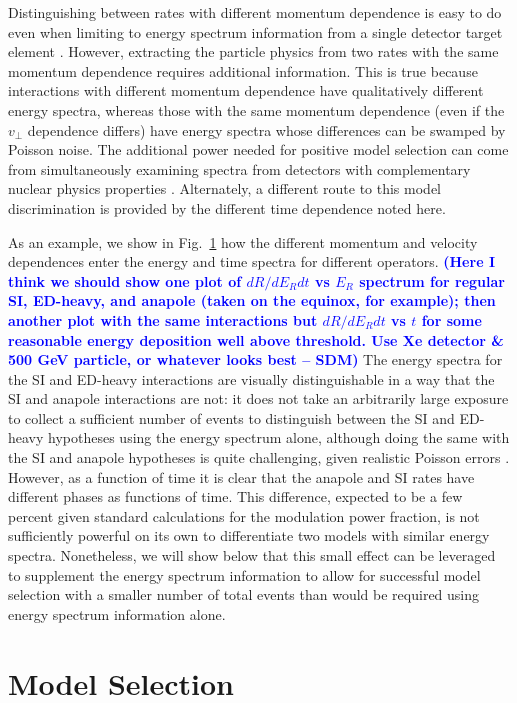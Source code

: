 \documentclass[11pt]{article}
\newcommand{\Fig}[1]{Fig.~\ref{#1}} \newcommand{\Figs}[2]{Figs.~\ref{#1} and \ref{#2}}
\newcommand{\sdm}[1]{\textcolor{blue}{\textbf{(#1 -- SDM)}}}
\begin{document}
Distinguishing between rates with different momentum dependence is easy to do even when limiting to energy spectrum information from a single detector target element \cite{Gluscevic:2015sqa}. However, extracting the particle physics from two rates with the same momentum dependence requires additional information. This is true because interactions with different momentum dependence have qualitatively different energy spectra, whereas those with the same momentum dependence (even if the $v_\perp$ dependence differs) have energy spectra whose differences can be swamped by Poisson noise. The additional power needed for positive model selection can come from simultaneously examining spectra from detectors with complementary nuclear physics properties \cite{Gluscevic:2015sqa}. Alternately, a different route to this model discrimination is provided by the different time dependence noted here.

As an example, we show in \Fig{} how the different momentum and velocity dependences enter the energy and time spectra for different operators. \sdm{Here I think we should show one plot of $dR/dE_R dt$ vs $E_R$ spectrum for regular SI, ED-heavy, and anapole (taken on the equinox, for example); then another plot with the same interactions but $dR/dE_R dt$ vs $t$ for some reasonable energy deposition well above threshold. Use Xe detector \& 500 GeV particle, or whatever looks best} The energy spectra for the SI and ED-heavy interactions are visually distinguishable in a way that the SI and anapole interactions are not: it does not take an arbitrarily large exposure to collect a sufficient number of events to distinguish between the SI and ED-heavy hypotheses using the energy spectrum alone, although doing the same with the SI and anapole hypotheses is quite challenging, given realistic Poisson errors \cite{Gluscevic:2015sqa}. However, as a function of time it is clear that the anapole and SI rates have different phases as functions of time. This difference, expected to be a few percent given standard calculations for the modulation power fraction, is not sufficiently powerful on its own to differentiate two models with similar energy spectra. Nonetheless, we will show below that this small effect can be leveraged to supplement the energy spectrum information to allow for successful model selection with a smaller number of total events than would be required using energy spectrum information alone.


\section{Model Selection}
\end{document}

